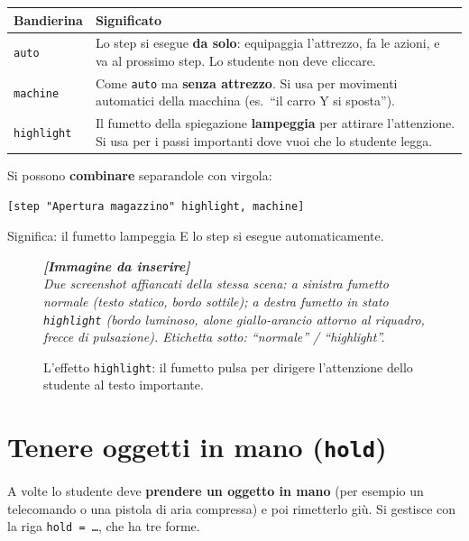 ﻿\documentclass[a4paper,12pt,oneside]{book}
\newcommand{\kw}[1]{\texttt{\color{keycolor}#1}}
\newcommand{\val}[1]{\texttt{\color{cvtgreen}#1}}
\newcommand{\imgph}[2]{%
  \begin{tcolorbox}[colback=cvtlightblue!30,colframe=cvtblue!40,%
    width=#1,halign=center,valign=center,height=5cm,boxrule=0.5pt,arc=3pt]%
    \textcolor{cvtgray}{\itshape\footnotesize\textbf{[Immagine da inserire]}\\[3pt]#2}%
  \end{tcolorbox}}
\begin{document}
\begin{longtable}{@{}lp{11cm}@{}}
\toprule
\textbf{Bandierina} & \textbf{Significato} \\
\midrule
\val{auto} & Lo step si esegue \textbf{da solo}: equipaggia l'attrezzo, fa le azioni,
             e va al prossimo step. Lo studente non deve cliccare. \\
\val{machine} & Come \val{auto} ma \textbf{senza attrezzo}. Si usa per movimenti
                automatici della macchina (es.\ ``il carro Y si sposta''). \\
\val{highlight} & Il fumetto della spiegazione \textbf{lampeggia} per attirare
                  l'attenzione. Si usa per i passi importanti dove vuoi che lo
                  studente legga. \\
\bottomrule
\end{longtable}

Si possono \textbf{combinare} separandole con virgola:

\begin{lstlisting}
[step "Apertura magazzino" highlight, machine]
\end{lstlisting}

Significa: il fumetto lampeggia E lo step si esegue automaticamente.

\begin{figure}[H]
  \centering
  \imgph{12cm}{Due screenshot affiancati della stessa scena: a sinistra fumetto normale (testo statico, bordo sottile); a destra fumetto in stato \val{highlight} (bordo luminoso, alone giallo-arancio attorno al riquadro, frecce di pulsazione). Etichetta sotto: ``normale'' / ``highlight''.}
  \caption{L'effetto \val{highlight}: il fumetto pulsa per dirigere l'attenzione dello studente al testo importante.}
  \label{fig:highlight-confronto}
\end{figure}

\chapter{Tenere oggetti in mano (\texttt{hold})}
\label{ch:hold}

A volte lo studente deve \textbf{prendere un oggetto in mano} (per esempio un
telecomando o una pistola di aria compressa) e poi rimetterlo giù. Si gestisce
con la riga \kw{hold = \ldots}, che ha tre forme.
\end{document}
